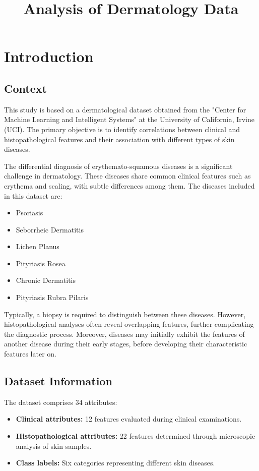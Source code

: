 \documentclass[a4paper,12pt]{article}
\title{Analysis of Dermatology Data}
\author{}
\date{}
\begin{document}
\maketitle

\section{Introduction}

\subsection{Context}
This study is based on a dermatological dataset obtained from the "Center for Machine Learning and Intelligent Systems" at the University of California, Irvine (UCI). The primary objective is to identify correlations between clinical and histopathological features and their association with different types of skin diseases.

The differential diagnosis of erythemato-squamous diseases is a significant challenge in dermatology. These diseases share common clinical features such as erythema and scaling, with subtle differences among them. The diseases included in this dataset are:
\begin{itemize}
    \item Psoriasis
    \item Seborrheic Dermatitis
    \item Lichen Planus
    \item Pityriasis Rosea
    \item Chronic Dermatitis
    \item Pityriasis Rubra Pilaris
\end{itemize}

Typically, a biopsy is required to distinguish between these diseases. However, histopathological analyses often reveal overlapping features, further complicating the diagnostic process. Moreover, diseases may initially exhibit the features of another disease during their early stages, before developing their characteristic features later on.

\subsection{Dataset Information}
The dataset comprises 34 attributes:
\begin{itemize}
    \item \textbf{Clinical attributes:} 12 features evaluated during clinical examinations.
    \item \textbf{Histopathological attributes:} 22 features determined through microscopic analysis of skin samples.
    \item \textbf{Class labels:} Six categories representing different skin diseases.
\end{itemize}
\end{document}
